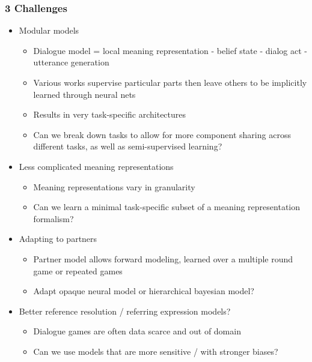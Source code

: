 \documentclass{beamer}
\begin{document}
\begin{frame}
\frametitle{3 Challenges}
\begin{itemize}
\item Modular models
    \begin{itemize}
    \item Dialogue model = local meaning representation -
        belief state - dialog act - utterance generation
    \item Various works supervise particular parts
        then leave others to be implicitly learned through
        neural nets
    \item Results in very task-specific architectures
    \item Can we break down tasks to allow for
        more component sharing across different tasks, as well as
        semi-supervised learning?
    \end{itemize}
\item Less complicated meaning representations
    \begin{itemize}
    \item Meaning representations vary in granularity
    \item Can we learn a minimal task-specific subset of a meaning
        representation formalism?
    \end{itemize}
\item Adapting to partners
    \begin{itemize}
    \item Partner model allows forward modeling, learned over
        a multiple round game or repeated games
    \item Adapt opaque neural model or hierarchical bayesian model?
    \end{itemize}
\item Better reference resolution / referring expression models?
    \begin{itemize}
    \item Dialogue games are often data scarce and out of domain
    \item Can we use models that are more sensitive / with stronger
        biases?
    \end{itemize}
\end{itemize}
\end{frame}
\end{document}
